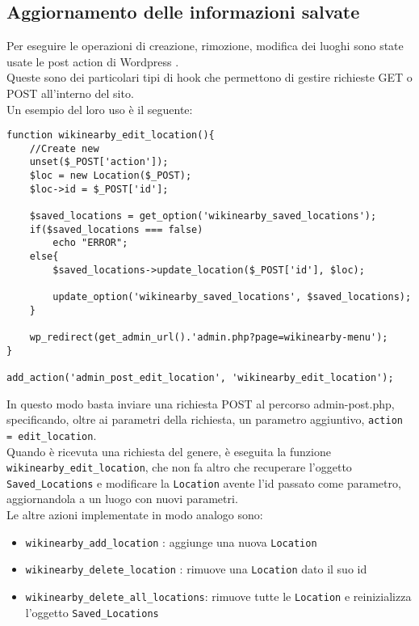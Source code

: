 \subsection*{Aggiornamento delle informazioni salvate}
Per eseguire le operazioni di creazione, rimozione, modifica dei luoghi sono state usate le post action di Wordpress \cite{postaction}.\\
Queste sono dei particolari tipi di hook che permettono di gestire richieste GET o POST all'interno del sito.\\
Un esempio del loro uso è il seguente:
\begin{lstlisting}
function wikinearby_edit_location(){
    //Create new
    unset($_POST['action']);
    $loc = new Location($_POST);
    $loc->id = $_POST['id'];

    $saved_locations = get_option('wikinearby_saved_locations');
    if($saved_locations === false)
        echo "ERROR";
    else{
        $saved_locations->update_location($_POST['id'], $loc);

        update_option('wikinearby_saved_locations', $saved_locations);
    }

    wp_redirect(get_admin_url().'admin.php?page=wikinearby-menu');
}

add_action('admin_post_edit_location', 'wikinearby_edit_location');
\end{lstlisting}

In questo modo basta inviare una richiesta POST al percorso admin-post.php, specificando, oltre ai parametri della richiesta, un parametro aggiuntivo, \texttt{action = edit\_location}.\\ 
Quando è ricevuta una richiesta del genere, è eseguita la funzione\\ \texttt{wikinearby\_edit\_location}, che non fa altro che recuperare l'oggetto \texttt{Saved\_Locations} e modificare la \texttt{Location} avente l'id passato come parametro, aggiornandola a un luogo con nuovi parametri.\\
Le altre azioni implementate in modo analogo sono:
\begin{itemize}
\item \texttt{wikinearby\_add\_location} : aggiunge una nuova \texttt{Location}
\item \texttt{wikinearby\_delete\_location} : rimuove una \texttt{Location} dato il suo id
\item \texttt{wikinearby\_delete\_all\_locations}: rimuove tutte le \texttt{Location} e reinizializza l'oggetto \texttt{Saved\_Locations}  
\end{itemize}
